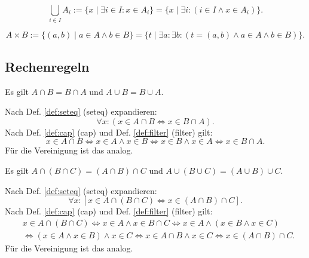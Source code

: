 \begin{Definition}\label{def:union}
\[\bigcup_{i\in I} A_i := \{x\mid \exists i{\in}I\colon x\in A_i\}
= \{x\mid \exists i\colon (i\in I\land x\in A_i)\}.\]
\end{Definition}

\begin{Definition}%
\label{def:cart}
\[A\times B := \{(a,b)\mid a\in A\land b\in B\}
= \{t\mid\exists a\colon\exists b\colon (t=(a,b)\land a\in A\land b\in B)\}.\]
\end{Definition}

\subsection{Rechenregeln}

\begin{Satz}[Kommutativgesetze]
Es gilt $A\cap B = B\cap A$ und $A\cup B = B\cup A$.
\end{Satz}

\begin{Beweis}
Nach Def. \ref{def:seteq} (seteq) expandieren:
\[\forall x\colon (x\in A\cap B \iff x\in B\cap A).\]
Nach Def. \ref{def:cap} (cap) und Def. \ref{def:filter} (filter) gilt:
\[x\in A\cap B \iff x\in A\land x\in B \iff x\in B\land x\in A
\iff x\in B\cap A.\]
Für die Vereinigung ist das analog.\,\qedsymbol
\end{Beweis}

\begin{Satz}[Assoziativgesetze]%
Es gilt $A\cap (B\cap C) = (A\cap B)\cap C$
und $A\cup (B\cup C) = (A\cup B)\cup C$.
\end{Satz}

\begin{Beweis}
Nach Def. \ref{def:seteq} (seteq) expandieren:
\[\forall x\colon [x\in A\cap (B\cap C) \iff x\in (A\cap B)\cap C].\]
Nach Def. \ref{def:cap} (cap) und Def. \ref{def:filter} (filter) gilt:
\begin{align*}
&x\in A\cap (B\cap C) \iff x\in A\land x\in B\cap C
\iff x\in A\land (x\in B\land x\in C)\\
&\iff (x\in A\land x\in B)\land x\in C
\iff x\in A\cap B\land x\in C
\iff x\in (A\cap B)\cap C.
\end{align*}
Für die Vereinigung ist das analog.\,\qedsymbol
\end{Beweis}

